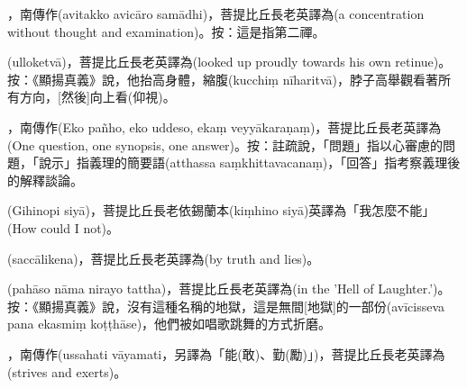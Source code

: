 \startitemgroup[noteitems]
\item{}，南傳作(avitakko avicāro samādhi)，菩提比丘長老英譯為(a concentration without thought and examination)。按：這是指第二禪。
\stopitemgroup

\startitemgroup[noteitems]
\item{}(ulloketvā)，菩提比丘長老英譯為(looked up proudly towards his own retinue)。按：《顯揚真義》說，他抬高身體，縮腹(kucchiṃ nīharitvā)，脖子高舉觀看著所有方向，[然後]向上看(仰視)。
\stopitemgroup

\startitemgroup[noteitems]
\item{}，南傳作(Eko pañho, eko uddeso, ekaṃ veyyākaraṇaṃ)，菩提比丘長老英譯為(One question, one synopsis, one answer)。按：註疏說，「問題」指以心審慮的問題，「說示」指義理的簡要語(atthassa saṃkhittavacanaṃ)，「回答」指考察義理後的解釋談論。
\stopitemgroup

\startitemgroup[noteitems]
\item{}(Gihinopi siyā)，菩提比丘長老依錫蘭本(kiṃhino siyā)英譯為「我怎麼不能」(How could I not)。
\stopitemgroup

\startitemgroup[noteitems]
\item{}(saccālikena)，菩提比丘長老英譯為(by truth and lies)。
\stopitemgroup

\startitemgroup[noteitems]
\item{}(pahāso nāma nirayo tattha)，菩提比丘長老英譯為(in the 'Hell of Laughter.')。按：《顯揚真義》說，沒有這種名稱的地獄，這是無間[地獄]的一部份(avīcisseva pana ekasmiṃ koṭṭhāse)，他們被如唱歌跳舞的方式折磨。
\stopitemgroup

\startitemgroup[noteitems]
\item{}，南傳作(ussahati vāyamati，另譯為「能(敢)、勤(勵)」)，菩提比丘長老英譯為(strives and exerts)。
\stopitemgroup

